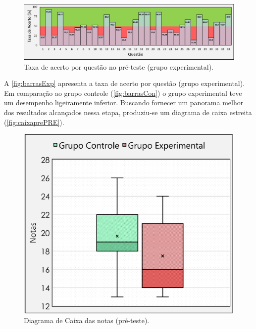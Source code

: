 \begin{figure}[htb]

    \caption{\label{fig:barrasExp}Taxa de acerto por questão no pré-teste (grupo experimental).}
    \includegraphics[width=\linewidth]{./Visuais/Notas3.pdf}
  
\end{figure}

A \autoref{fig:barrasExp} apresenta a taxa de acerto por questão (grupo experimental). Em comparação ao grupo controle (\autoref{fig:barrasCon}) o grupo experimental teve um desempenho ligeiramente inferior. Buscando fornecer um panorama melhor dos resultados alcançados nessa etapa, produziu-se um diagrama de caixa estreita (\autoref{fig:caixaprePRE}).

\begin{figure}%
    \vspace{-4pt}
    \caption{\label{fig:caixaprePRE}Diagrama de Caixa das notas (pré-teste).}
    \includegraphics[width=\linewidth]{./Visuais/CaixaEstreitaEnfeitado.pdf}
\end{figure}

